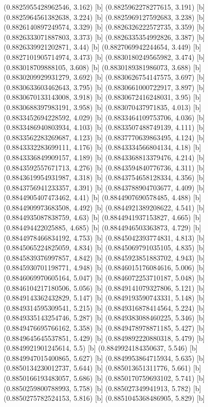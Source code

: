 {{{(0.8825955428962546, 3.162) [b] 
(0.8825962278277615, 3.191) [b] 
(0.8825964561382638, 3.224) [b] 
(0.8825969127592683, 3.238) [b] 
(0.8826140897249574, 3.329) [b] 
(0.8826326222572735, 3.359) [b] 
(0.8826333071887803, 3.373) [b] 
(0.8826335354992826, 3.387) [b] 
(0.8826339921202871, 3.44) [b] 
(0.8827069942244654, 3.449) [b] 
(0.8827101905714974, 3.473) [b] 
(0.8830180249565982, 3.474) [b] 
(0.883018709888105, 3.608) [b] 
(0.8830189381986073, 3.688) [b] 
(0.8830209929931279, 3.692) [b] 
(0.8830626754147575, 3.697) [b] 
(0.8830633603462643, 3.795) [b] 
(0.8830661000722917, 3.897) [b] 
(0.8830670133143008, 3.918) [b] 
(0.8830672416248031, 3.95) [b] 
(0.8830688397983191, 3.958) [b] 
(0.883070437971835, 4.013) [b] 
(0.8833452694228592, 4.029) [b] 
(0.8833464109753706, 4.036) [b] 
(0.8833486940803934, 4.103) [b] 
(0.8833507488749139, 4.111) [b] 
(0.8833562283269687, 4.123) [b] 
(0.8837770639863495, 4.124) [b] 
(0.8843332283699111, 4.176) [b] 
(0.8843334566804134, 4.18) [b] 
(0.8843336849909157, 4.189) [b] 
(0.8843368813379476, 4.214) [b] 
(0.8843592557671713, 4.276) [b] 
(0.8843594840776736, 4.311) [b] 
(0.8843619954931987, 4.318) [b] 
(0.8843754658128334, 4.356) [b] 
(0.8843756941233357, 4.391) [b] 
(0.8843788904703677, 4.409) [b] 
(0.8844905407473462, 4.41) [b] 
(0.8844907690578485, 4.488) [b] 
(0.8844909973683508, 4.492) [b] 
(0.8844921389208622, 4.541) [b] 
(0.8844935087838759, 4.63) [b] 
(0.8844941937153827, 4.665) [b] 
(0.884494422025885, 4.685) [b] 
(0.8844946503363873, 4.729) [b] 
(0.8844978466834192, 4.753) [b] 
(0.8845042393774831, 4.813) [b] 
(0.8845065224825059, 4.834) [b] 
(0.8845069791035105, 4.835) [b] 
(0.8845839376997857, 4.842) [b] 
(0.8845923851883702, 4.943) [b] 
(0.8845930701198771, 4.948) [b] 
(0.8846015176084616, 5.006) [b] 
(0.8846069970605164, 5.047) [b] 
(0.8846072253710187, 5.048) [b] 
(0.8846104217180506, 5.056) [b] 
(0.8849141079327806, 5.121) [b] 
(0.8849143362432829, 5.147) [b] 
(0.8849193590743331, 5.148) [b] 
(0.8849314595309541, 5.215) [b] 
(0.8849316878414564, 5.224) [b] 
(0.8849335143254746, 5.287) [b] 
(0.8849383088460225, 5.346) [b] 
(0.8849476695766162, 5.358) [b] 
(0.8849478978871185, 5.427) [b] 
(0.8849645645537851, 5.429) [b] 
(0.8849892220880318, 5.479) [b] 
(0.8849921901245614, 5.5) [b] 
(0.8849924184350637, 5.546) [b] 
(0.8849947015400865, 5.627) [b] 
(0.8849953864715934, 5.635) [b] 
(0.8850134230012737, 5.644) [b] 
(0.885013651311776, 5.661) [b] 
(0.8850166193483057, 5.686) [b] 
(0.8850170759693102, 5.741) [b] 
(0.8850259800788993, 5.758) [b] 
(0.885027349941913, 5.782) [b] 
(0.8850275782524153, 5.816) [b] 
(0.8851045368486905, 5.829) [b] 
}}}
